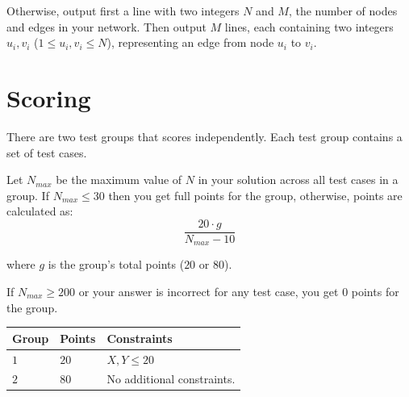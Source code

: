Otherwise, output first a line with two integers $N$ and $M$, the number of nodes and edges in your network.
Then output $M$ lines, each containing two integers $u_i, v_i$ ($1 \leq u_i, v_i \leq N$), 
representing an edge from node $u_i$ to $v_i$.

\section*{Scoring}
There are two test groups that scores independently. Each test group contains
a set of test cases. 
 
Let $N_{max}$ be the maximum value of $N$ in your solution across all test cases in a group. 
If $N_{max} \leq 30$ then you get full points for the group, 
otherwise, points are calculated as:  
$$\frac{20 \cdot g}{N_{max} - 10}$$  

where $g$ is the group's total points ($20$ or $80$).

If $N_{max} \geq 200$ or your answer is incorrect for any test case, you get 0 points for the group.

\noindent
\begin{tabular}{| l | l | p{12cm} |}
  \hline
  \textbf{Group} & \textbf{Points} & \textbf{Constraints} \\ \hline
  $1$    & $20$        & $X, Y \leq 20$ \\ \hline
  $2$    & $80$        & No additional constraints. \\ \hline
\end{tabular}
